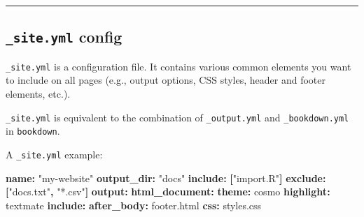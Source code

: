 \documentclass[
  a4paper,
  twoside,
  openright]{book}
\newenvironment{Shaded}{\begin{snugshade}}{\end{snugshade}}
\newcommand{\AttributeTok}[1]{\textcolor[rgb]{0.13,0.29,0.53}{#1}}
\newcommand{\FunctionTok}[1]{\textcolor[rgb]{0.13,0.29,0.53}{\textbf{#1}}}
\newcommand{\KeywordTok}[1]{\textcolor[rgb]{0.13,0.29,0.53}{\textbf{#1}}}
\newcommand{\StringTok}[1]{\textcolor[rgb]{0.31,0.60,0.02}{#1}}
\theoremstyle{definition}
\theoremstyle{definition}
\theoremstyle{definition}
\theoremstyle{definition}
\theoremstyle{remark}
\begin{document}
\begin{center}\rule{0.5\linewidth}{0.5pt}\end{center}

\subsection*{\texorpdfstring{\texttt{\_site.yml} config}{\_site.yml config}}\label{site.yml-config}

\texttt{\_site.yml} is a configuration file. It contains various common elements you want to include on all pages (e.g., output options, CSS styles, header and footer elements, etc.).

\texttt{\_site.yml} is equivalent to the combination of \texttt{\_output.yml} and \texttt{\_bookdown.yml} in \texttt{bookdown}.

A \texttt{\_site.yml} example:

\begin{Shaded}
\begin{Highlighting}[]
\FunctionTok{name}\KeywordTok{:}\AttributeTok{ }\StringTok{"my{-}website"}
\FunctionTok{output\_dir}\KeywordTok{:}\AttributeTok{ }\StringTok{"docs"}
\FunctionTok{include}\KeywordTok{:}\AttributeTok{ }\KeywordTok{[}\StringTok{"import.R"}\KeywordTok{]}
\FunctionTok{exclude}\KeywordTok{:}\AttributeTok{ }\KeywordTok{[}\StringTok{"docs.txt"}\KeywordTok{,}\AttributeTok{ }\StringTok{"*.csv"}\KeywordTok{]}
\FunctionTok{output}\KeywordTok{:}
\AttributeTok{  }\FunctionTok{html\_document}\KeywordTok{:}
\AttributeTok{    }\FunctionTok{theme}\KeywordTok{:}\AttributeTok{ cosmo}
\AttributeTok{    }\FunctionTok{highlight}\KeywordTok{:}\AttributeTok{ textmate}
\AttributeTok{    }\FunctionTok{include}\KeywordTok{:}
\AttributeTok{      }\FunctionTok{after\_body}\KeywordTok{:}\AttributeTok{ footer.html}
\AttributeTok{    }\FunctionTok{css}\KeywordTok{:}\AttributeTok{ styles.css}
\end{Highlighting}
\end{Shaded}
\end{document}
